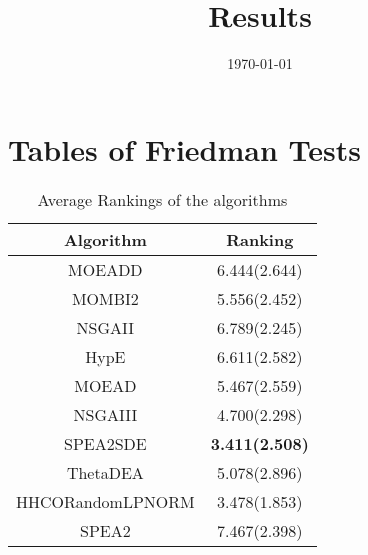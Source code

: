 \documentclass{article}
\title{Results}
\author{}
\date{\today}
\begin{document}
\oddsidemargin 0in \topmargin 0in\maketitle
\section{Tables of Friedman Tests}
\begin{table}[!htp]
\centering
\caption{Average Rankings of the algorithms
}\begin{tabular}{|c|c|}
\hline
Algorithm&Ranking\\
\hline
MOEADD&6.444(2.644)\\\hline
MOMBI2&5.556(2.452)\\\hline
NSGAII&6.789(2.245)\\\hline
HypE&6.611(2.582)\\\hline
MOEAD&5.467(2.559)\\\hline
NSGAIII&4.700(2.298)\\\hline
SPEA2SDE& {\bf 3.411(2.508)}\\\hline
ThetaDEA&5.078(2.896)\\\hline
HHCORandomLPNORM&3.478(1.853)\\\hline
SPEA2&7.467(2.398)\\\hline
\end{tabular}
\end{table}
\end{document}
